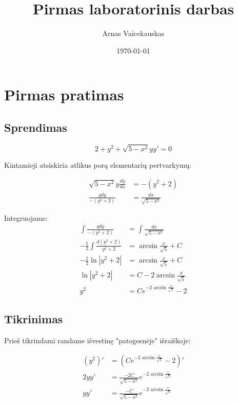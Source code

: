 \documentclass[11pt]{article}
\title{ Pirmas laboratorinis darbas}
\author{ Arnas Vaicekauskas }
\date{\today}
\begin{document}
\maketitle

\section{Pirmas pratimas}

\subsection{Sprendimas}

\setlength{\jot}{10px}

$$
2+y^2+\sqrt{5-x^2}yy'=0
$$

Kintamieji atsiskiria atlikus porą elementarių pertvarkymų:

\begin{equation}
\begin{split}
\sqrt{5-x^2}y\frac{dy}{dx}&=-(y^2+2) \\
\frac{ydy}{-(y^2+2)}&=\frac{dx}{\sqrt{5-x^2}}
\end{split}
\end{equation}

Integruojame:
\begin{equation}
    \begin{split}
        \int\frac{ydy}{-(y^2+2)}&=\int\frac{dx}{\sqrt{5-x^2}} \\
        -\frac{1}{2}\int\frac{d(y^2+2)}{y^2+2}&=\arcsin{\frac{x}{\sqrt{5}}}+C\\
        -\frac{1}{2}\ln|y^2+2|&=\arcsin{\frac{x}{\sqrt{5}}}+C\\
        \ln|y^2+2|&=C-2\arcsin{\frac{x}{\sqrt{5}}}\\
        y^2&=Ce^{-2\arcsin{\frac{x}{\sqrt{5}}}} - 2
    \end{split}
\end{equation}


\newpage
\subsection{Tikrinimas}

Prieš tikrindami randame išvestinę "patogesnėje" išraiškoje:

\begin{equation}
    \begin{split}
        (y^2)'&=(Ce^{-2\arcsin{\frac{x}{\sqrt{5}}}} - 2)' \\
        2yy'&=\frac{-2C}{\sqrt{5-x^2}}e^{-2\arcsin{\frac{x}{\sqrt{5}}}}\\
        yy'&=\frac{-C}{\sqrt{5-x^2}}e^{-2\arcsin{\frac{x}{\sqrt{5}}}}
    \end{split}
\end{equation}
\end{document}
